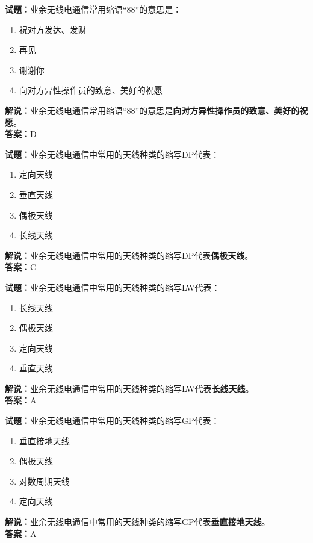 \documentclass{ctexbook}
\begin{document}
\bigskip


\noindent\textbf{试题：}业余无线电通信常用缩语“88”的意思是：
\begin{enumerate}[leftmargin=3em]
\item 祝对方发达、发财
\item 再见
\item 谢谢你
\item 向对方异性操作员的致意、美好的祝愿
\end{enumerate}
\noindent\textbf{解说：}业余无线电通信常用缩语“88”的意思是\textbf{向对方异性操作员的致意、美好的祝愿}。\\\noindent\textbf{答案：}D



\bigskip


\noindent\textbf{试题：}业余无线电通信中常用的天线种类的缩写DP代表：
\begin{enumerate}[leftmargin=3em]
\item 定向天线
\item 垂直天线
\item 偶极天线
\item 长线天线
\end{enumerate}
\noindent\textbf{解说：}业余无线电通信中常用的天线种类的缩写DP代表\textbf{偶极天线}。\\\noindent\textbf{答案：}C



\bigskip


\noindent\textbf{试题：}业余无线电通信中常用的天线种类的缩写LW代表：
\begin{enumerate}[leftmargin=3em]
\item 长线天线
\item 偶极天线
\item 定向天线
\item 垂直天线
\end{enumerate}
\noindent\textbf{解说：}业余无线电通信中常用的天线种类的缩写LW代表\textbf{长线天线}。\\\noindent\textbf{答案：}A



\bigskip


\noindent\textbf{试题：}业余无线电通信中常用的天线种类的缩写GP代表：
\begin{enumerate}[leftmargin=3em]
\item 垂直接地天线
\item 偶极天线
\item 对数周期天线
\item 定向天线
\end{enumerate}
\noindent\textbf{解说：}业余无线电通信中常用的天线种类的缩写GP代表\textbf{垂直接地天线}。\\\noindent\textbf{答案：}A
\end{document}
